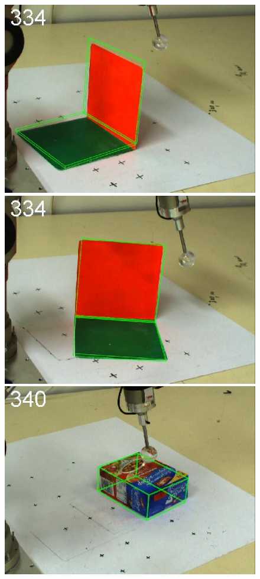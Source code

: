 \begin{figure}[htbp]
{}
\centerline{
\includegraphics[width=\imgAXwid]{images/A1_2exp_667_5}
\includegraphics[width=\imgAXwid]{images/A1_2exp_876_5}
\includegraphics[width=\imgAXwid]{images/A2_2exp_399_5}
}
\end{figure}
